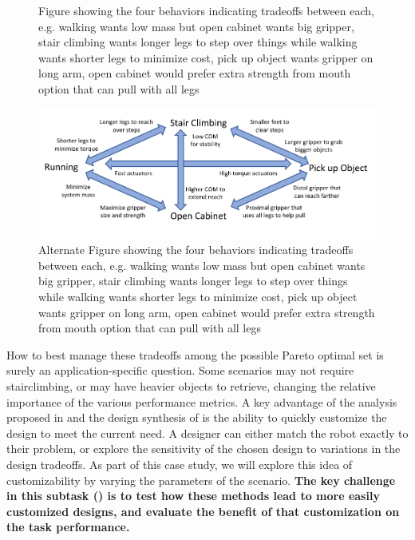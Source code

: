 \documentclass[11pt]{article}
\begin{document}
\begin{figure}
    \centering
    \caption{Figure showing the four behaviors indicating tradeoffs between each, e.g. walking wants low mass but open cabinet wants big gripper, stair climbing wants longer legs to step over things while walking wants shorter legs to minimize cost, pick up object wants gripper on long arm, open cabinet would prefer extra strength from mouth option that can pull with all legs}
    \label{fig:my_label}
\end{figure}

\begin{figure}
    \centering
    \includegraphics{arrows.pdf}
    \caption{Alternate Figure showing the four behaviors indicating tradeoffs between each, e.g. walking wants low mass but open cabinet wants big gripper, stair climbing wants longer legs to step over things while walking wants shorter legs to minimize cost, pick up object wants gripper on long arm, open cabinet would prefer extra strength from mouth option that can pull with all legs}
    \label{fig:my_label}
\end{figure}

How to best manage these tradeoffs among the possible Pareto optimal set is surely an application-specific question. Some scenarios may not require stairclimbing, or may have heavier objects to retrieve, changing the relative importance of the various performance metrics. A key advantage of the analysis proposed in  and the design synthesis of  is the ability to quickly customize the design to meet the current need. A designer can either match the robot exactly to their problem, or explore the sensitivity of the chosen design to variations in the design tradeoffs. As part of this case study, we will explore this idea of customizability by varying the parameters of the scenario. {\bf The key challenge in this subtask () is to test how these methods lead to more easily customized designs, and evaluate the benefit of that customization on the task performance.}
\end{document}
